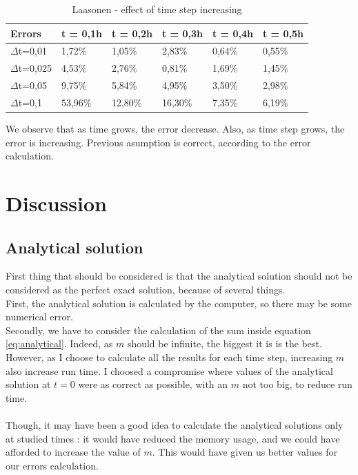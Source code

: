 \documentclass{article}
\begin{document}
        \begin{table}[H]
            \centering
            \caption{Laasonen - effect of time step increasing }
            \label{table:laas}
            \begin{tabular}{|l|l|l|l|l|l|}
                \hline
                Errors    & t = 0,1h & t = 0,2h  & t = 0,3h  & t = 0,4h & t = 0,5h \\ \hline
                $\Delta$t=0,01  & 1,72\%   & 1,05\%  & 2,83\%  & 0,64\% & 0,55\% \\ \hline
                $\Delta$t=0,025 & 4,53\%   & 2,76\%  & 0,81\%  & 1,69\% & 1,45\% \\ \hline
                $\Delta$t=0,05  & 9,75\%   & 5,84\%  & 4,95\%  & 3,50\% & 2,98\% \\ \hline
                $\Delta$t=0,1   & 53,96\%  & 12,80\% & 16,30\% & 7,35\% & 6,19\% \\ \hline
            \end{tabular}
        \end{table}

        We observe that as time grows, the error decrease. Also, as time step grows, the error is increasing.
        Previous asumption is correct, according to the error calculation.
    \newpage
    \section{Discussion}
        \subsection{Analytical solution}
            First thing that should be considered is that the analytical solution should not be
            considered as the perfect exact solution, because of several things.
            \\
            First, the analytical solution is calculated by the computer, so there may be some numerical error.
            \\
            Secondly, we have to consider the calculation of the sum inside equation \eqref{eq:analytical}.
            Indeed, as $m$ should be infinite, the biggest it is is the best. However, as I choose to calculate
            all the results for each time step, increasing $m$ also increase run time. I choosed a compromise
            where values of the analytical solution at $t=0$ were as correct as possible, with an $m$ not too big,
            to reduce run time.
            \\
            \\
            Though, it may have been a good idea to calculate the analytical solutions only at studied times : 
            it would have reduced the memory usage, and we could have afforded to increase the value of $m$.
            This would have given us better values for our errors calculation.
\end{document}
